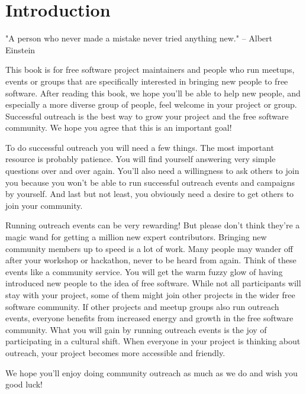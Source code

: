 \chapter{Introduction}

"A person who never made a mistake never tried anything new." -- Albert Einstein 

This book is for free software project maintainers and people who run meetups, events or groups that are specifically interested in bringing new people to free software. After reading this book, we hope you’ll be able to help new people, and especially a more diverse group of people, feel welcome in your project or group. Successful outreach is the best way to grow your project and the free software community. We hope you agree that this is an important goal! 

To do successful outreach you will need a few things. The most important resource is probably patience. You will find yourself answering very simple questions over and over again. You’ll also need a willingness to ask others to join you because you won’t be able to run successful outreach events and campaigns by yourself. And last but not least, you obviously need a desire to get others to join your community.

Running outreach events can be very rewarding! But please don’t think they’re a magic wand for getting a million new expert contributors. Bringing new community members up to speed is a lot of work. Many people may wander off after your workshop or hackathon, never to be heard from again. Think of these events like a community service. You will get the warm fuzzy glow of having introduced new people to the idea of free software. While not all participants will stay with your project, some of them might join other projects in the wider free software community. If other projects and meetup groups also run outreach events, everyone benefits from increased energy and growth in the free software community. What you will gain by running outreach events is the joy of participating in a cultural shift. When everyone in your project is thinking about outreach, your project becomes more accessible and friendly.

We hope you’ll enjoy doing community outreach as much as we do and wish you good luck!